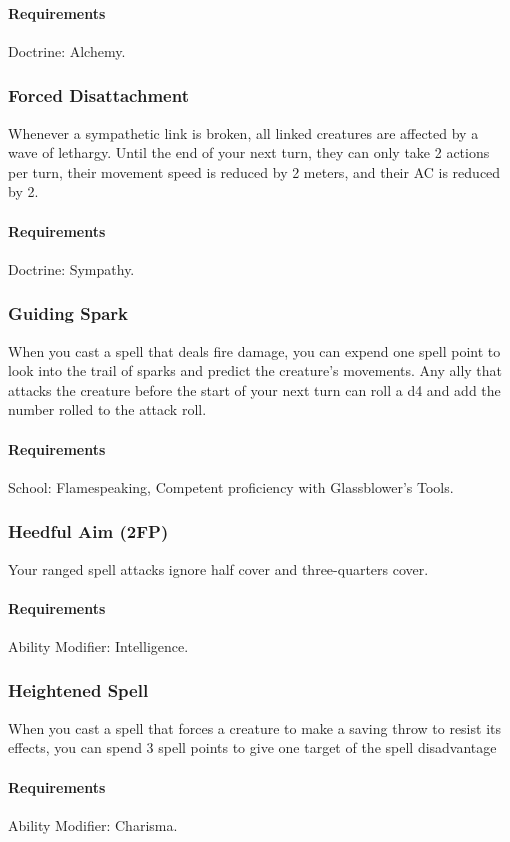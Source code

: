     \paragraph{Requirements} Doctrine: Alchemy.
\subsubsection{Forced Disattachment} \label{feat::forceddisattachment}
    Whenever a sympathetic link is broken, all linked creatures are affected by a wave of lethargy.
    Until the end of your next turn, they can only take 2 actions per turn, their movement speed is reduced by 2 meters, and their AC is reduced by 2.
    \paragraph{Requirements} Doctrine: Sympathy.
\subsubsection{Guiding Spark} \label{feat::guidingspark}
    When you cast a spell that deals fire damage, you can expend one spell point to look into the trail of sparks and predict the creature's movements.
    Any ally that attacks the creature before the start of your next turn can roll a d4 and add the number rolled to the attack roll.
    \paragraph{Requirements} School: Flamespeaking, Competent proficiency with Glassblower's Tools.
\subsubsection{Heedful Aim (2FP)} \label{feat::heedfulaim}
    Your ranged spell attacks ignore half cover and three-quarters cover.
    \paragraph{Requirements} Ability Modifier: Intelligence.
\subsubsection{Heightened Spell} \label{feat::heightenedspell}
    When you cast a spell that forces a creature to make a saving throw to resist its effects, you can spend 3 spell points to give one target of the spell disadvantage
    \paragraph{Requirements} Ability Modifier: Charisma.

